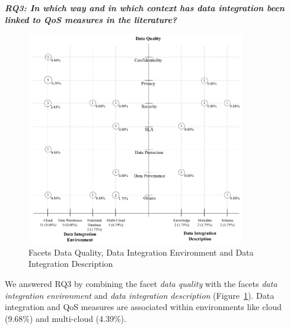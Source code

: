 \textbf{\textit{RQ3:  In which way and in which context has data integration been linked to QoS measures in the literature?}}
\begin{figure}[!h]
\centering
\includegraphics[width=0.85\textwidth]{figs/bubble-charts/Data-Quality-DI.pdf}
\caption{Facets Data Quality, Data Integration Environment and Data Integration Description}\label{fig:facet4}
\end{figure}

We answered RQ3 by combining the facet {\em data quality} with the facets {\em data integration environment} and {\em data integration description}
(Figure~\ref{fig:facet4}).  Data integration and QoS measures are associated within environments like cloud  (9.68\%) and multi-cloud (4.39\%).


